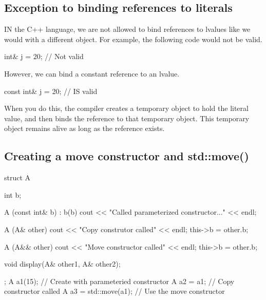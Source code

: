\documentclass{report}
\begin{document}
    \bigbreak \noindent 
    \subsection{Exception to binding references to literals}
    \bigbreak \noindent 
    IN the C++ language, we are not allowed to bind references to lvalues like we would with a different object. For example, the following code would not be valid.
    \bigbreak \noindent 
    \begin{cppcode}
        int& j = 20; // Not valid
    \end{cppcode}
    \bigbreak \noindent 
    However, we can bind a constant reference to an lvalue.
    \bigbreak \noindent 
    \begin{cppcode}
        const int& j = 20; // IS valid
    \end{cppcode}
    \bigbreak \noindent 
    When you do this, the compiler creates a temporary object to hold the literal value, and then binds the reference to that temporary object. This temporary object remains alive as long as the reference exists.

    \pagebreak
    \subsection{Creating a move constructor and std::move()}
    \bigbreak \noindent 
    \begin{cppcode}
struct A {
    int b;

    A (const int& b) : b(b) { cout << "Called parameterized constructor..." << endl; }

    A (A& other) {
        cout << "Copy construtor called" << endl;
        this->b = other.b;
    }

    A (A&& other) {
        cout << "Move constructor called" << endl;
        this->b = other.b;
    }

    void display(A& other1, A& other2);

};
A a1(15); // Create with parameteried constructor
A a2 = a1; // Copy constructor called
A a3 = std::move(a1); // Use the move constructor
    \end{cppcode}

    \bigbreak \noindent 
\end{document}
